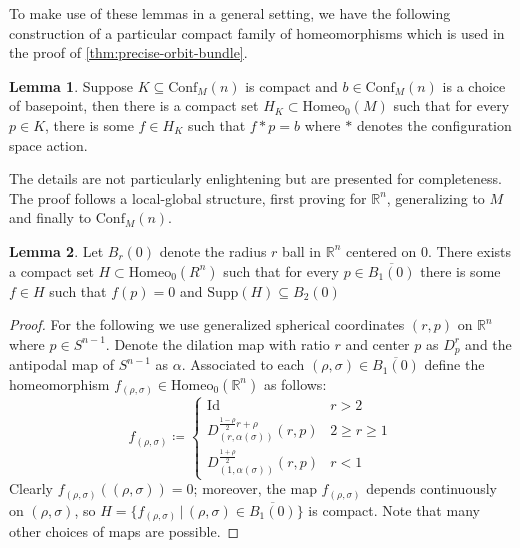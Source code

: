 \documentclass[10pt, oneside]{article}
\newcommand{\R}{\mathbb{R}}
\newcommand{\homeo}[1][S^1]{\text{Homeo}_0(#1)}
\newcommand{\cl}[1]{\overline{#1}}
\newcommand{\conf}[2][S^1]{\text{Conf}_{#2}(#1)}
\theoremstyle{definition}
\newtheorem{lem}{Lemma}[section]
\theoremstyle{definition}
\begin{document}
To make use of these lemmas in a general setting, we have the following construction of a particular compact family of homeomorphisms which is used in the proof of \cref{thm:precise-orbit-bundle}.

\begin{lem}\label{lem:cpct-to-basepoint-confM}
    Suppose $K\subseteq\conf[n]{M}$ is compact and $b\in\conf[n]{M}$ is a choice of basepoint, then there is a compact set $H_K\subset\homeo[M]$ such that for every $p\in K$, there is some $f\in H_K$ such that $f*p=b$ where $*$ denotes the configuration space action.
\end{lem}

The details are not particularly enlightening but are presented for completeness. The proof follows a local-global structure, first proving for $\R^n$, generalizing to $M$ and finally to $\conf[n]{M}$.

\begin{lem}
    Let $B_r(0)$ denote the radius $r$ ball in $\R^n$ centered on 0. There exists a compact set $H\subset\homeo[R^n]$ such that for every $p\in \cl{B_1(0)}$ there is some $f\in H$ such that $f(p)=0$ and $\text{Supp}(H) \subseteq B_2(0)$
\end{lem}
\begin{proof}
    For the following we use generalized spherical coordinates $(r, p)$ on $\R^n$ where $p\in S^{n-1}$. Denote the dilation map with ratio $r$ and center $p$ as $D_p^r$ and the antipodal map of $S^{n-1}$ as $\alpha$. Associated to each $(\rho, \sigma)\in \cl{B_1(0)}$ define the homeomorphism $f_{(\rho, \sigma)}\in\homeo[\R^n]$ as follows:
    \[f_{(\rho,\sigma)} \coloneqq
    \begin{cases}
        \text{Id} & r>2\\[.8em]
        D_{(r,\alpha(\sigma))}^{\frac{1-\rho}{2}r+\rho}(r,p) & 2\geq r \geq 1 \\[1em]
        D_{(1, \alpha(\sigma))}^{\frac{1+\rho}{2}}(r,p) & r < 1
    \end{cases}
    \]
    Clearly $f_{(\rho, \sigma)}((\rho,\sigma))=0$; moreover, the map $f_{(\rho,\sigma)}$ depends continuously on $(\rho,\sigma)$, so $H=\{f_{(\rho,\sigma)}\,\vert\, (\rho,\sigma)\in\cl{B_1(0)}\}$ is compact.
    Note that many other choices of maps are possible.
\end{proof}
\end{document}
